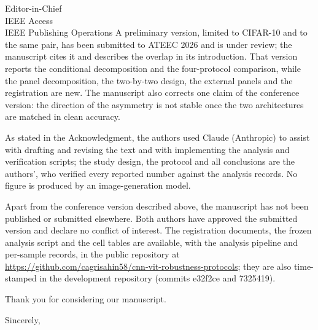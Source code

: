 \documentclass[11pt]{letter}
\begin{document}
\begin{letter}{
Editor-in-Chief\\
IEEE Access\\
IEEE Publishing Operations
}
A preliminary version, limited to CIFAR-10 and to the same pair, has been submitted to ATEEC 2026 and is under review; the manuscript cites it and describes the overlap in its introduction. That version reports the conditional decomposition and the four-protocol comparison, while the panel decomposition, the two-by-two design, the external panels and the registration are new. The manuscript also corrects one claim of the conference version: the direction of the asymmetry is not stable once the two architectures are matched in clean accuracy.

As stated in the Acknowledgment, the authors used Claude (Anthropic) to assist with drafting and revising the text and with implementing the analysis and verification scripts; the study design, the protocol and all conclusions are the authors', who verified every reported number against the analysis records. No figure is produced by an image-generation model.

Apart from the conference version described above, the manuscript has not been published or submitted elsewhere. Both authors have approved the submitted version and declare no conflict of interest. The registration documents, the frozen analysis script and the cell tables are available, with the analysis pipeline and per-sample records, in the public repository at \url{https://github.com/cagrisahin58/cnn-vit-robustness-protocols}; they are also time-stamped in the development repository (commits e32f2ce and 7325419).

Thank you for considering our manuscript.

\closing{Sincerely,}

\end{letter}
\end{document}
